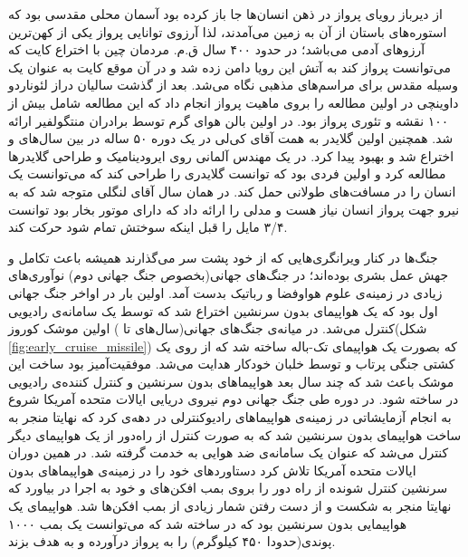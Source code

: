 از دیرباز رویای پرواز در ذهن انسان‌ها جا باز کرده بود آسمان محلی مقدسی بود که استوره‌های باستان از آن به زمین می‌آمدند، لذا آرزوی توانایی پرواز یکی از کهن‌ترین آرزوهای آدمی می‌باشد؛ در حدود ۴۰۰ سال ق.م. مردمان چین با اختراع کایت که می‌توانست پرواز کند به آتش این رویا دامن زده شد و در آن موقع کایت به عنوان یک وسیله مقدس برای مراسم‌های مذهبی نگاه می‌شد. بعد از گذشت سالیان دراز لئوناردو داوینچی در  اولین مطالعه را بروی ماهیت پرواز انجام داد که این مطالعه شامل بیش از ۱۰۰ نقشه و تئوری پرواز بود. در  اولین بالن هوای گرم توسط برادران منتگولفیر ارائه شد. همچنین اولین گلایدر به همت آقای کی‌لی در یک دوره ۵۰ ساله در بین سال‌های  و  اختراع شد و بهبود پیدا کرد. در  یک مهندس آلمانی روی ایرودینامیک و طراحی گلایدرها مطالعه کرد و اولین فردی بود که توانست گلایدری را طراحی کند که می‌توانست یک انسان را در مسافت‌های طولانی حمل کند. در همان سال آقای لنگلی متوجه شد که به نیرو جهت پرواز انسان نیاز هست و مدلی را ارائه داد که دارای موتور بخار بود توانست ۳/۴ مایل را قبل اینکه سوختش تمام شود حرکت کند.

جنگ‌ها در کنار ویرانگری‌هایی که از خود پشت سر می‌گذارند همیشه باعث تکامل و جهش عمل بشری بوده‌اند؛ در جنگ‌های جهانی(بخصوص جنگ جهانی دوم) نوآوری‌های زیادی در زمینه‌ی علوم هواوفضا و رباتیک بدست آمد. اولین بار در اواخر جنگ جهانی اول بود که یک هواپیمای بدون سرنشین اختراع شد که توسط یک سامانه‌ی رادیویی کنترل می‌شد. در میانه‌ی جنگ‌های جهانی(سال‌های  تا ) اولین موشک کوروز(شکل \ref{fig:early_cruise_missile}) که بصورت یک هواپیمای تک-باله ساخته شد که از روی یک کشتی جنگی پرتاب و توسط خلبان خودکار هدایت می‌شد. موفقیت‌آمیز بود ساخت این موشک باعث شد که چند سال بعد هواپیماهای بدون سرنشین و کنترل کننده‌ی رادیویی در  ساخته شود. در دوره طی جنگ جهانی دوم نیروی دریایی ایالات متحده آمریکا شروع به انجام آزمایشاتی در زمینه‌ی هواپیما‌های رادیوکنترلی در دهه‌‌ی  کرد که نهایتا منجر به ساخت هواپیمای بدون سرنشین  شد که به صورت کنترل از راه‌دور از یک هواپیمای دیگر کنترل می‌شد که عنوان یک سامانه‌ی ضد هوایی به خدمت گرفته شد. در همین دوران ایالات متحده آمریکا تلاش کرد دستاوردهای خود را در زمینه‌ی هواپیماهای بدون سرنشین کنترل شونده از راه دور را بروی بمب افکن‌های  و  خود به اجرا در بیاورد که نهایتا منجر به شکست و از دست رفتن شمار زیادی از بمب افکن‌ها شد. هواپیمای  یک هواپیمایی بدون سرنشین بود که در  ساخته شد که می‌توانست یک بمب ۱۰۰۰ پوندی(حدودا ۴۵۰ کیلوگرم) را به پرواز درآورده و به هدف بزند.


